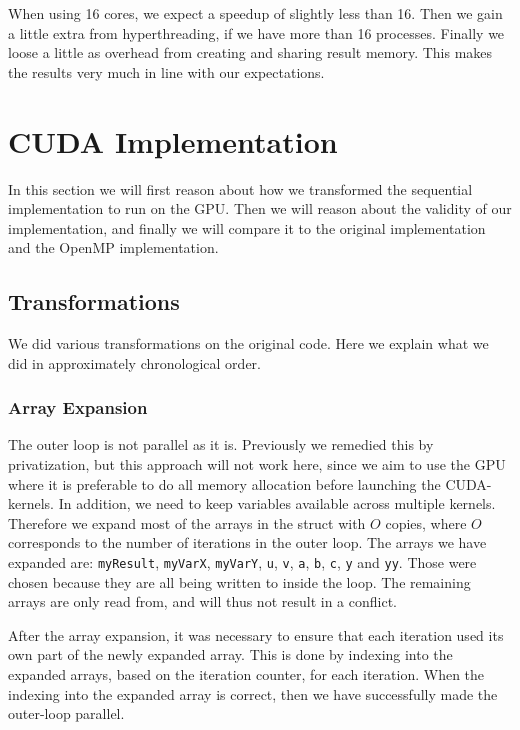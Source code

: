 \documentclass[11pt]{article}
\begin{document}
When using 16 cores, we expect a speedup of slightly less than 16. Then we 
gain a little extra from hyperthreading, if we have more than 16 processes. 
Finally we loose a little as overhead from creating and sharing result memory.
This makes the results very much in line with our expectations.


\section{CUDA Implementation}
In this section we will first reason about how we transformed the sequential
implementation to run on the GPU. Then we will reason about the validity of 
our implementation, and finally we will compare it to the original 
implementation and the OpenMP implementation.

\subsection{Transformations}
We did various transformations on the original code. Here we explain what we 
did in approximately chronological order.

\subsubsection{Array Expansion}
The outer loop is not parallel as it is. Previously we remedied this by privatization,
but this approach will not work here, since we aim to use the GPU where
it is preferable to do all memory allocation before launching the CUDA-kernels.
In addition, we need to keep variables available across multiple kernels. Therefore we
expand most of the arrays in the struct with $O$ copies, where $O$ corresponds to
the number of iterations in the outer loop. The arrays we have expanded are:
\texttt{myResult}, \texttt{myVarX}, \texttt{myVarY}, \texttt{u}, \texttt{v}, \texttt{a}, \texttt{b}, \texttt{c}, \texttt{y} and \texttt{yy}. Those were chosen because 
they are all being written to inside the loop. The remaining arrays are only 
read from, and will thus not result in a conflict. 

After the array expansion,
it was necessary to ensure that each iteration used its own part of the newly
expanded array. This is done by indexing into the expanded arrays, based on the
iteration counter, for each iteration. When the indexing into the expanded
array is correct, then we have successfully made the outer-loop parallel.
\end{document}
